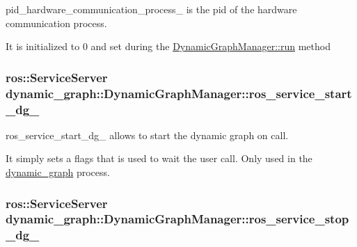 pid\+\_\+hardware\+\_\+communication\+\_\+process\+\_\+ is the pid of the hardware communication process. 

It is initialized to 0 and set during the \hyperlink{classdynamic__graph_1_1DynamicGraphManager_a93272fcbb3793dfc92422186022ecf72}{Dynamic\+Graph\+Manager\+::run} method 
\subsubsection[{\texorpdfstring{ros\+\_\+service\+\_\+start\+\_\+dg\+\_\+}{ros_service_start_dg_}}]{\setlength{\rightskip}{0pt plus 5cm}ros\+::\+Service\+Server dynamic\+\_\+graph\+::\+Dynamic\+Graph\+Manager\+::ros\+\_\+service\+\_\+start\+\_\+dg\+\_\+\hspace{0.3cm}{\ttfamily [protected]}}\hypertarget{classdynamic__graph_1_1DynamicGraphManager_adb99ba3a7a5e677b30531a69bcc922ec}{}\label{classdynamic__graph_1_1DynamicGraphManager_adb99ba3a7a5e677b30531a69bcc922ec}


ros\+\_\+service\+\_\+start\+\_\+dg\+\_\+ allows to start the dynamic graph on call. 

It simply sets a flags that is used to wait the user call. Only used in the \hyperlink{namespacedynamic__graph}{dynamic\+\_\+graph} process. 
\subsubsection[{\texorpdfstring{ros\+\_\+service\+\_\+stop\+\_\+dg\+\_\+}{ros_service_stop_dg_}}]{\setlength{\rightskip}{0pt plus 5cm}ros\+::\+Service\+Server dynamic\+\_\+graph\+::\+Dynamic\+Graph\+Manager\+::ros\+\_\+service\+\_\+stop\+\_\+dg\+\_\+\hspace{0.3cm}{\ttfamily [protected]}}\hypertarget{classdynamic__graph_1_1DynamicGraphManager_adf973b6da4e4fe14cae262ba94ebb191}{}\label{classdynamic__graph_1_1DynamicGraphManager_adf973b6da4e4fe14cae262ba94ebb191}


